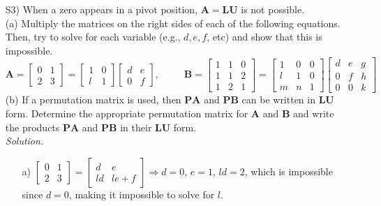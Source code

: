\documentclass[12pt]{article}
\begin{document}
\begin{itemize}
\item[S3)] When a zero appears in a  pivot position, $\mathbf{A}=\mathbf{L}\mathbf{U}$ is not possible. \\
(a) Multiply the matrices on the right sides of each of the following equations. Then, try to solve for each variable (e.g., $d, e, f$, etc) and show that this is impossible.  
\begin{equation*}
\mathbf{A}=\left[\begin{array}{cc}  0&1 \\2  &3 \end{array}\right]  = \left[\begin{array}{cc} 1 &0 \\ l & 1\end{array}\right]\left[\begin{array}{cc} d & e\\ 0 & f\end{array}\right], \hspace{30pt} \mathbf{B}= \left[\begin{array}{ccc} 1 & 1 & 0\\ 1 & 1 & 2\\ 1& 2& 1\end{array}\right] = \left[\begin{array}{ccc} 1 & 0 & 0\\ l & 1 &0 \\m &n &1 \end{array}\right]\left[\begin{array}{ccc} d & e & g\\ 0 & f & h\\ 0& 0& k\end{array}\right]
\end{equation*}
(b) If a permutation matrix is used, then $\mathbf{PA}$ and $\mathbf{PB}$ can be written in $\mathbf{LU}$ form.  Determine the appropriate permutation matrix for $\mathbf{A}$ and $\mathbf{B}$ and write the products $\mathbf{PA}$ and $\mathbf{PB}$ in their $\mathbf{LU}$ form. \\
\textit{Solution.}
	\begin{itemize}
	\item[a)] $\left[\begin{array}{cc}  0 & 1 \\ 2 & 3 \end{array}\right]= 
    		   \left[\begin{array}{cc}  d & e \\ ld & le+f \end{array}\right] \Rightarrow d=0$, $e=1$, $ld=2$, which is 			   impossible since $d=0$, making it impossible to solve for $l$. \\

\end{itemize}
\end{itemize}
\end{document}
